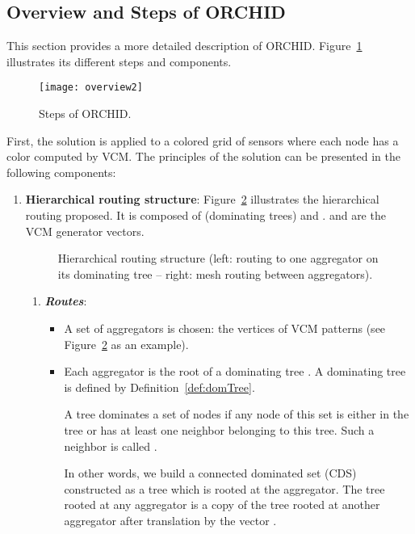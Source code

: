 \subsection{Overview and Steps of ORCHID}
This section provides a more detailed description of ORCHID. Figure~\ref{fig:steps} illustrates its different steps and components.

\begin{figure}[H]
\centering
\texttt{[image: overview2]}\caption{Steps of ORCHID.\label{fig:steps}}
\end{figure}
First, the solution is applied to a colored grid of sensors where each node has a color computed by VCM. The principles of the solution can be presented in the following components:

\begin{enumerate}
\item \textbf{Hierarchical routing structure}:
Figure~\ref{fig:overview} illustrates the hierarchical routing proposed. It is composed of  (dominating trees) and .  and  are the VCM generator vectors.
\begin{figure}[H]
\centering
{}
\caption{Hierarchical routing structure (left: routing to one aggregator on its dominating tree -- right: mesh routing between aggregators).\label{fig:overview}}
\end{figure}
\begin{enumerate}
\item \textbf{\textit{Routes}}:
\begin{itemize}


\item A set of aggregators is chosen: the vertices of VCM patterns (see Figure~\ref{fig:overview} as an example).
\item Each aggregator  is the root of a dominating tree . A dominating tree is defined by Definition~\ref{def:domTree}.
\begin{definition} \label{def:domTree}
A tree  dominates a set of nodes if any node of this set is either in the tree or has at least one neighbor belonging to this tree. Such a neighbor is called .
\end{definition}

In other words, we build a connected dominated set (CDS) constructed as a tree which is rooted at the aggregator. The tree rooted at any aggregator  is a copy of the tree rooted at another aggregator  after translation by the vector . 


\end{itemize}
\end{enumerate}
\end{enumerate}
